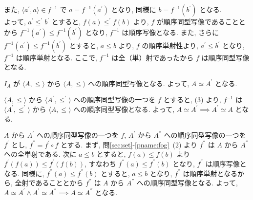 \begin{nmprob}
{また, $\langle a^{'}, a\rangle \in f^{-1}$ で $a = f^{-1}(a^{'})$ となり, 同様に $b = f^{-1}(b^{'})$ となる.\\
よって, $a^{'} \leq^{'} b^{'}$ とすると, $f(a) \leq^{'} f(b)$ より, $f$ が順序同型写像であることとから $f^{-1}(a^{'}) \leq f^{-1}(b^{'})$ となり, $f^{-1}$ は順序写像となる.
また, さらに $f^{-1}(a^{'}) \leq f^{-1}(b^{'})$ とすると, $a \leq b$ より, $f$ の順序単射性より, $a^{'} \leq b^{'}$ となり, $f^{-1}$ は順序単射となる.
ここで, $f^{-1}$ は全（単）射であったから $f$ は順序同型写像となる.
\item $I_A$ が $\langle A, \leq \rangle$ から $\langle A, \leq \rangle$ への順序同型写像となる. よって, $A \simeq A^{'}$ となる.
\item $\langle A, \leq \rangle$ から $\langle A^{'}, \leq^{'} \rangle$ への順序同型写像の一つを $f$ とすると, (3) より, $f^{-1}$ は $\langle A^{'}, \leq^{'} \rangle$ から $\langle A, \leq \rangle$ への順序同型写像となる.
よって, $A \simeq A^{'} \implies A^{'} \simeq A$ となる.
\item $A$ から $A^{'}$ への順序同型写像の一つを $f$, $A^{'}$ から $A^{''}$ への順序同型写像の一つを $f^{'}$ とし, $f^{''} = f^{'} \circ f$ とする.
まず, 問\ref{sec:set}-\ref{pname:fog}\ (2) より $f^{''}$ は $A$ から $A^{''}$ への全単射である. 次に $a \leq b$ とすると, $f(a) \leq f(b)$ より $f^{'}(f(a)) \leq f^{'}(f(b))$, すなわち $f^{''}(a) \leq f^{''}(b)$ となり, $f^{''}$ は順序写像となる.
同様に, $f^{''}(a) \leq f^{''}(b)$ とすると, $a \leq b$ となり, $f^{''}$ は順序単射となるから, 全射であることとから $f^{''}$ は $A$ から $A^{''}$ への順序同型写像となる.
よって, $A \simeq A^{'} \land A^{'} \simeq A^{''} \implies A \simeq A^{''}$ となる.
}
\end{nmprob}




